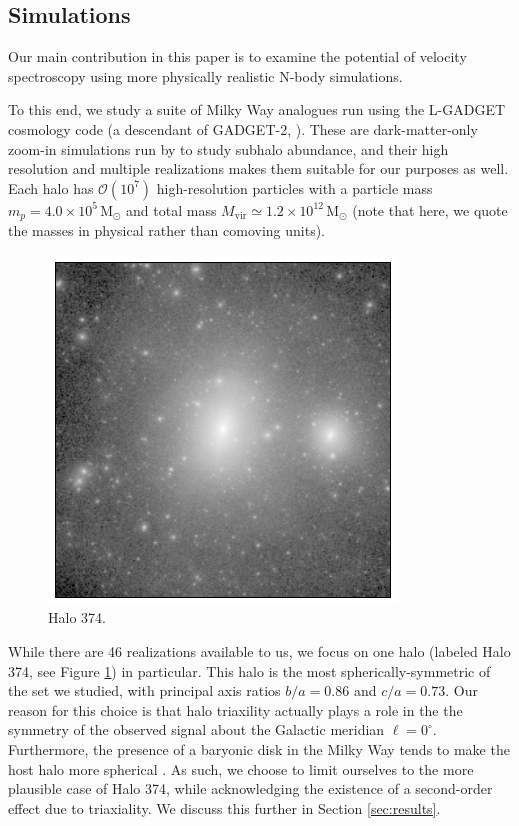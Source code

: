 \documentclass[aps,prl,10pt,twocolumn,superscriptaddress,showpacs]{revtex4-1}
\begin{document}
\subsection{Simulations}{
\label{sec:simulations}

Our main contribution in this paper is to examine the potential of velocity spectroscopy using
more physically realistic N-body simulations.

To this end, we study a suite of Milky Way analogues run using the L-GADGET cosmology code
(a descendant of GADGET-2, \cite{springel2005}). These are dark-matter-only zoom-in simulations 
run by \cite{mao2015} to study subhalo abundance, and their high resolution and multiple
realizations makes them suitable for our purposes as well. Each halo has $\mathcal{O}(10^7)$
high-resolution particles with a particle mass $m_p=4.0\times10^5\, \mathrm{M_{\odot}}$ and total 
mass $M_{\mathrm{vir}}\simeq1.2\times10^{12}\,\mathrm{M_{\odot}}$ (note that here, we quote the masses in physical rather than comoving
units).

\begin{figure}[h!]
\centering
\includegraphics[width=0.9\columnwidth]{halo374.png}
\caption{Halo 374.}
\label{fig:halo374}
\end{figure}

While there are 46 realizations available to us, we focus on one halo (labeled Halo 374, see Figure
\ref{fig:halo374}) in particular. 
This halo is the most spherically-symmetric of the set we studied, with principal axis ratios
$b/a=0.86$ and $c/a=0.73$. Our reason for this choice is that halo triaxility actually plays a role
in the the symmetry of the observed signal about the Galactic meridian $\ell=0^{\circ}$.
Furthermore, the presence of a baryonic disk in the Milky Way tends to make the host
halo more spherical \cite{debattista2008, bryan2013}. As such, we choose to limit ourselves to the more plausible case of
Halo 374, while acknowledging the existence of a second-order effect due to triaxiality. 
We discuss this further in Section \ref{sec:results}.

}
\end{document}
